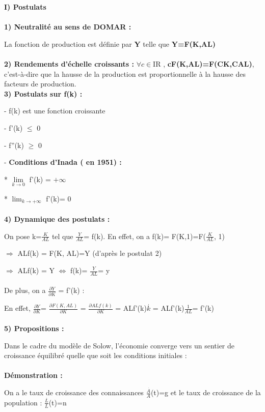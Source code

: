 \documentclass{article}
\def\nbR{\ensuremath{\mathrm{I\! R}}}
\begin{document}
\textbf{I) Postulats}
\\\\
\textbf{1) Neutralité au sens de DOMAR : }

	La fonction de production est définie par \textbf{Y} telle que \textbf{Y=F(K,AL)}
\\\\
\textbf{2) Rendements d'échelle croissants : }
$\forall c \in $\nbR$ $ , \textbf{cF(K,AL)=F(CK,CAL)}, c'est-à-dire que la hausse de la production est proportionnelle à la hausse des facteurs de production.
\newline\\
\textbf{3) Postulats sur f(k) : }

- f(k) est une fonction croissante

- f'(k) $\leq$ 0

- f''(k) $\geq$ 0

- \textbf{ Conditions d'Inada ( en 1951) : }

* $\lim\limits_{k \to 0}$ f'(k) = $+\infty$            				

* $\lim_{k \to +\infty}$ f'(k)= 0
\\\\
\textbf{4) Dynamique des postulats : }

On pose k=$\frac{K}{AL}$ tel que $\frac{Y}{AL}$= f(k). En effet, on a f(k)= F(K,1)=F($ \frac{K}{AL}$, 1)

$\Rightarrow$ ALf(k) = F(K, AL)=Y (d'après le postulat 2)

 $\Rightarrow$ ALf(k) = Y $\Leftrightarrow$ f(k)= $\frac{Y}{AL}$= y
\\\\
De plus, on a $\frac{\partial Y}{\partial K}$ = f'(k) :

En effet, $\frac{\partial Y}{\partial K}$= $\frac{\partial F(K,AL)}{\partial K}$ = $\frac{\partial ALf(k)}{\partial K}$ = ALf'(k)$\stackrel{.}{k}$ = ALf'(k)$\frac{1}{AL}$= f'(k)
\\\\
\textbf{5) Propositions : }

Dans le cadre du modèle de Solow, l'économie converge vers un sentier de croissance équilibré quelle que soit les conditions initiales :
\\\\
\textbf{Démonstration : }

On a le taux de croissance des connaissances  $\frac{\stackrel{.}{A}}{A}$(t)=g et le taux de croissance de la population : $\frac{\stackrel{.}{L}}{L}$(t)=n
\end{document}

